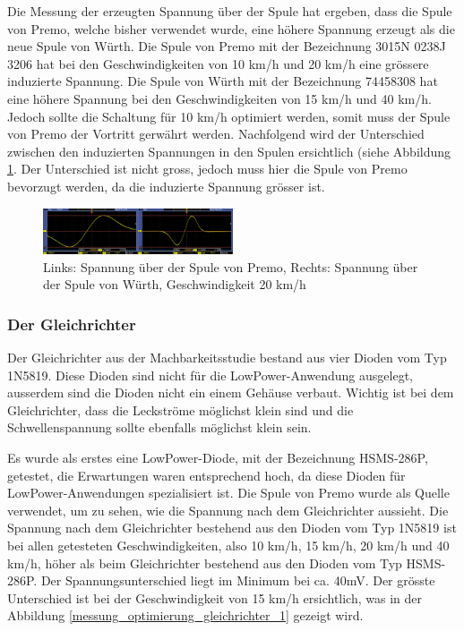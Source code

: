 Die Messung der erzeugten Spannung über der Spule hat ergeben, dass die Spule von Premo, welche bisher verwendet wurde, eine höhere Spannung erzeugt als die neue Spule von Würth. Die Spule von Premo mit der Bezeichnung 3015N 0238J 3206 hat bei den Geschwindigkeiten von 10 km/h und 20 km/h eine grössere induzierte Spannung. Die Spule von Würth mit der Bezeichnung 74458308 hat eine höhere Spannung bei den Geschwindigkeiten von 15 km/h und 40 km/h. Jedoch sollte die Schaltung für 10 km/h optimiert werden, somit muss der Spule von Premo der Vortritt gerwährt werden. Nachfolgend wird der Unterschied zwischen den induzierten Spannungen in den Spulen ersichtlich (siehe Abbildung \ref{messung_optimierung_spule}. Der Unterschied ist nicht gross, jedoch muss hier die Spule von Premo bevorzugt werden, da die induzierte Spannung grösser ist.

\begin{figure}[ht]
    \includegraphics[width=0.5\textwidth]{3Vorgehen/imag/Messung_Optimierung_Spule.png}
    \caption{Links: Spannung über der Spule von Premo, Rechts: Spannung über der Spule von Würth, Geschwindigkeit 20 km/h}               
    \label{messung_optimierung_spule} 
\end{figure}

\subsubsection{Der Gleichrichter}

Der Gleichrichter aus der Machbarkeitsstudie bestand aus vier Dioden vom Typ 1N5819. Diese Dioden sind nicht für die LowPower-Anwendung ausgelegt, ausserdem sind die Dioden nicht ein einem Gehäuse verbaut. Wichtig ist bei dem Gleichrichter, dass die Leckströme möglichst klein sind und die Schwellenspannung sollte ebenfalls möglichst klein sein.

Es wurde als erstes eine LowPower-Diode, mit der Bezeichnung HSMS-286P, getestet, die Erwartungen waren entsprechend hoch, da diese Dioden für LowPower-Anwendungen spezialisiert ist. Die Spule von Premo wurde als Quelle verwendet, um zu sehen, wie die Spannung nach dem Gleichrichter aussieht. Die Spannung nach dem Gleichrichter bestehend aus den Dioden vom Typ 1N5819 ist bei allen getesteten Geschwindigkeiten, also 10 km/h, 15 km/h, 20 km/h und 40 km/h, höher als beim Gleichrichter bestehend aus den Dioden vom Typ HSMS-286P. Der Spannungsunterschied liegt im Minimum bei ca. 40mV. Der grösste Unterschied ist bei der Geschwindigkeit von 15 km/h ersichtlich, was in der Abbildung \ref{messung_optimierung_gleichrichter_1} gezeigt wird.

